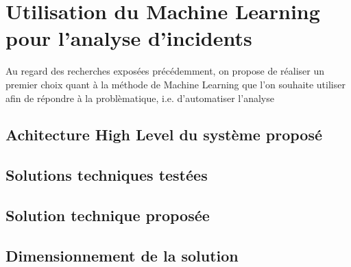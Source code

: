 \chapter{Utilisation du Machine Learning pour l'analyse d'incidents}
\label{Utilisation du Machine Learning pour l'analyse d'incidents}
\thispagestyle{fancy}

Au regard des recherches exposées précédemment, on propose de réaliser un premier choix quant à la méthode de Machine Learning que l'on souhaite utiliser afin de répondre à la problèmatique, i.e. d'automatiser l'analyse 

\section{Achitecture High Level du système proposé}
\label{Utilisation du Machine Learning pour l'analyse d'incidents: Achitecture High Level du système proposé}

\section{Solutions techniques testées}
\label{Utilisation du Machine Learning pour l'analyse d'incidents: Solutions techniques testées}

\section{Solution technique proposée}
\label{Utilisation du Machine Learning pour l'analyse d'incidents: Solution technique proposée}

\section{Dimensionnement de la solution}
\label{Utilisation du Machine Learning pour l'analyse d'incidents: Dimensionnement de la solution}